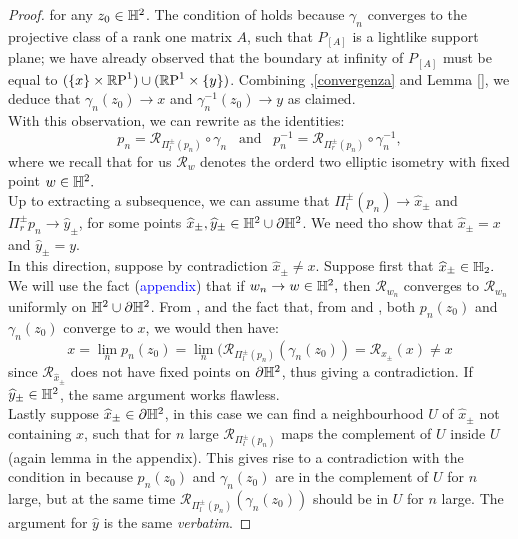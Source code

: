 \begin{proof}
  for any $z_0\in\H^2$. The condition of  holds because $\gamma_n$ converges to the projective class of a rank one matrix $A$, such that $P_{[A]}$ is a lightlike support plane; we have already observed that the boundary at infinity of $P_[A]$ must be equal to $(\{x\}\times\S)\cup(\S\times\{y\})$. Combining ,\ref{convergenza} and Lemma \ref{}, we deduce that $\gamma_n(z_0)\to x$ and $\gamma_n^{-1}(z_0)\to y$ as claimed. \\
  With this observation, we can rewrite  as the identities: 
  \begin{equation}\label{21}
    p_n=\mathcal{R}_{\Pi_l^\pm(p_n)}\circ\gamma_n \;\;\; \text{and}\;\;\; p_n^{-1}=\mathcal{R}_{\Pi_r^\pm(p_n)}\circ\gamma_n^{-1}, 
  \end{equation} 
  where we recall that for us $\mathcal{R}_w$ denotes the orderd two elliptic isometry with fixed point $w\in\H^2.$ \\
  Up to extracting a subsequence, we can assume that $\Pi_l^{\pm}(p_n)\to\widehat{x}_\pm$ and $\Pi_r^\pm{p_n}\to\widehat{y}_\pm$, for some points $\widehat{x}_\pm, \widehat{y}_\pm\in\H^2\cup\partial\H^2$. We need tho show that $\widehat{x}_\pm=x$ and $\widehat{y}_\pm=y$. \\
  In this direction, suppose by contradiction $\widehat{x}_\pm\neq x$. Suppose first that $\widehat{x}_\pm\in\H_2.$ We will use the fact (\textcolor{blue}{appendix})
  that if $w_n\to w\in \H^2,$ then $\mathcal{R}_{w_n}$ converges to $\mathcal{R}_{w_n}$ uniformly on $\H^2\cup\partial\H^2$. From , and the fact that, from  and , both $p_n(z_0)$ and $\gamma_n(z_0)$ converge to $x$, we would then have: 
  \[
    x=\lim_n p_n(z_0)=\lim_n(\mathcal{R}_{\Pi_l^\pm(p_n)}(\gamma_n(z_0))=\mathcal{R}_{\widehat{x}_\pm}(x)\neq x
  \]
  since $\mathcal{R}_{\widehat{x}_\pm}$ does not have fixed points on $\partial\H^2$, thus giving a contradiction. If $\widehat{y}_\pm\in\H^2$, the same argument works flawless. \\
  Lastly suppose $\widehat{x}_\pm\in\partial\H^2$, in this case we can find a neighbourhood $U$ of $\widehat{x}_\pm$ not containing $x$, such that for $n$ large $\mathcal{R}_{\Pi_l^\pm(p_n)}$ maps the complement of $U$ inside $U$ (again lemma in the appendix). This gives rise to a contradiction with the condition in  because $p_n(z_0)$ and $\gamma_n(z_0)$ are in the complement of $U$ for $n$ large, but at the same time $\mathcal{R}_{\Pi_l^{\pm}(p_n)}(\gamma_n(z_0))$ should be in $U$ for $n$ large. The argument for $\widehat{y}$ is the same \textit{verbatim}.
\end{proof}

